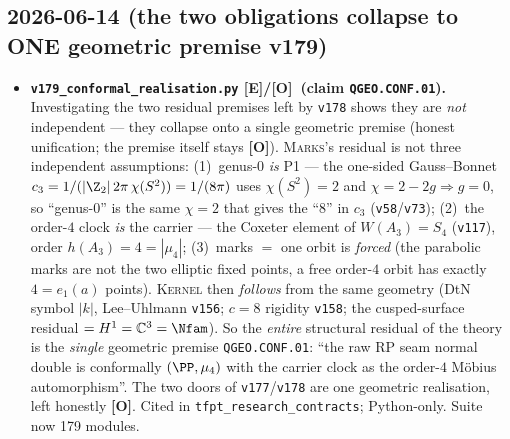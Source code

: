 \documentclass[11pt]{article}
\providecommand{\mE}{\textbf{[E]}}\providecommand{\mC}{\textbf{[C]}}
\providecommand{\mO}{\textbf{[O]}}\providecommand{\mX}{\textbf{[X]}}
\providecommand{\vref}[1]{\texttt{#1}}
\begin{document}
\subsection*{2026-06-14 (the two obligations collapse to ONE geometric premise v179)}
\begin{itemize}
\item \textbf{\texttt{v179\_conformal\_realisation.py} \mE/\mO\ (claim \texttt{QGEO.CONF.01}).}
  Investigating the two residual premises left by \vref{v178} shows they are \emph{not} independent ---
  they collapse onto a single geometric premise (honest unification; the premise itself stays \mO).
  \textsc{Marks}'s residual is not three independent assumptions: (1)~genus-$0$ \emph{is} P1 --- the
  one-sided Gauss--Bonnet $c_3=1/(|\Z_2|\,2\pi\,\chi(S^2))=1/(8\pi)$ uses $\chi(S^2)=2$ and
  $\chi=2-2g\Rightarrow g=0$, so ``genus-$0$'' is the same $\chi=2$ that gives the ``$8$'' in $c_3$
  (\vref{v58}/\vref{v73}); (2)~the order-$4$ clock \emph{is} the carrier --- the Coxeter element of
  $W(A_3)=S_4$ (\vref{v117}), order $h(A_3)=4=|\mu_4|$; (3)~marks $=$ one orbit is \emph{forced} (the
  parabolic marks are not the two elliptic fixed points, a free order-$4$ orbit has exactly $4=e_1(a)$
  points). \textsc{Kernel} then \emph{follows} from the same geometry (DtN symbol $|k|$, Lee--Uhlmann
  \vref{v156}; $c=8$ rigidity \vref{v158}; the cusped-surface residual $=H^1=\mathbb C^3=\Nfam$). So
  the \emph{entire} structural residual of the theory is the \emph{single} geometric premise
  \texttt{QGEO.CONF.01}: ``the raw RP seam normal double is conformally $(\PP,\mu_4)$ with the carrier
  clock as the order-$4$ M\"obius automorphism''. The two doors of \vref{v177}/\vref{v178} are one
  geometric realisation, left honestly \mO. Cited in \texttt{tfpt\_research\_contracts}; Python-only.
  Suite now 179 modules.
\end{itemize}
\end{document}
